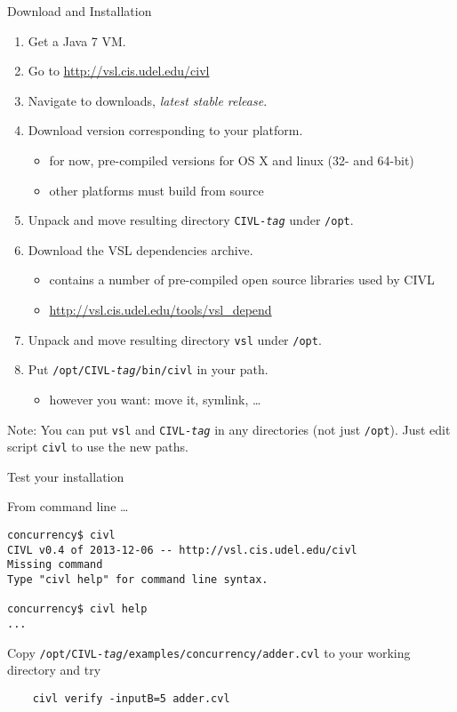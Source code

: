 \documentclass[t]{beamer}
\begin{document}
\begin{frame}{Download and Installation}
  \begin{enumerate}
  \item Get a Java 7 VM.
  \item Go to \url{http://vsl.cis.udel.edu/civl}
  \item Navigate to downloads, \emph{latest stable release}.
  \item Download version corresponding to your platform.
    \begin{itemize}
    \item for now, pre-compiled versions for OS X and linux (32- and 64-bit)
    \item other platforms must build from source
    \end{itemize}
  \item Unpack and move resulting directory \texttt{CIVL-\textit{tag}}
    under \texttt{/opt}.
  \item Download the VSL dependencies archive.
    \begin{itemize}
    \item contains a number of pre-compiled open source libraries used by CIVL
    \item \url{http://vsl.cis.udel.edu/tools/vsl\_depend}
    \end{itemize}
  \item Unpack and move resulting directory \texttt{vsl} under \texttt{/opt}.
  \item Put \texttt{/opt/CIVL-\textit{tag}/bin/civl} in your path.
    \begin{itemize}
    \item however you want: move it, symlink, \ldots
    \end{itemize}
  \end{enumerate}

  \alert{Note:} You can put \texttt{vsl} and \texttt{CIVL-\textit{tag}}
  in any directories (not just \texttt{/opt}).  Just edit script \texttt{civl}
  to use the new paths.
\end{frame}

\begin{frame}[containsverbatim]{Test your installation}

  From command line \ldots

\begin{verbatim}
concurrency$ civl
CIVL v0.4 of 2013-12-06 -- http://vsl.cis.udel.edu/civl
Missing command
Type "civl help" for command line syntax.

concurrency$ civl help
...
\end{verbatim}

Copy \texttt{/opt/CIVL-\textit{tag}/examples/concurrency/adder.cvl}
to your working directory and try

\begin{verbatim}
    civl verify -inputB=5 adder.cvl
\end{verbatim}
\end{frame}
\end{document}
